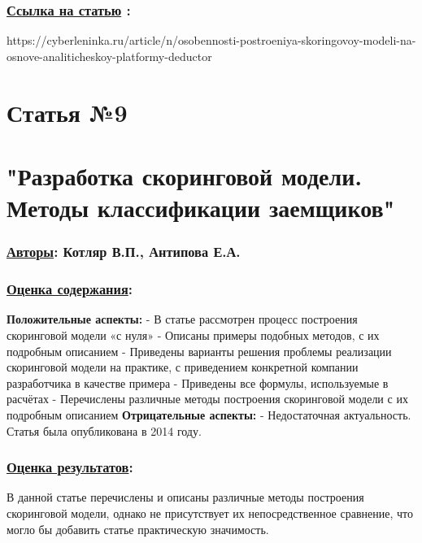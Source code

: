 \documentclass[a4paper,14pt]{article}
\begin{document}
\subsubsection*{\underline{Ссылка на статью} :}
https://cyberleninka.ru/article/n/osobennosti-postroeniya-skoringovoy-modeli-na-osnove-analiticheskoy-platformy-deductor



\newpage


\section*{Статья №9}
\section*{"Разработка скоринговой модели. Методы классификации заемщиков"}
\subsubsection*{\underline{Авторы}: Котляр В.П., Антипова Е.А.}

\subsubsection*{\underline{Оценка содержания}:}
\textbf{Положительные аспекты:} \newline
- В статье рассмотрен процесс построения скоринговой модели «с нуля» \newline
- Описаны примеры подобных методов, с их подробным описанием \newline
- Приведены варианты решения проблемы реализации скоринговой модели на практике, с приведением конкретной компании разработчика в качестве примера \newline
- Приведены все формулы, используемые в расчётах \newline
- Перечислены различные методы построения скоринговой модели с их подробным описанием \vspace{10pt} \newline
\textbf{Отрицательные аспекты:} \newline
- Недостаточная актуальность. Статья была опубликована в 2014 году.
\subsubsection*{\underline{Оценка результатов}:}
В данной статье перечислены и описаны различные методы построения скоринговой модели, однако не присутствует их непосредственное сравнение, что могло бы добавить статье практическую значимость.
\end{document}
